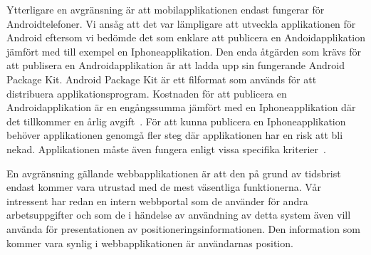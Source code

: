 \documentclass[a4paper,12pt]{article}
\begin{document}
%

Ytterligare en avgränsning är att mobilapplikationen endast fungerar för Androidtelefoner.
Vi ansåg att det var lämpligare att utveckla applikationen för Android eftersom vi bedömde det som enklare att publicera en Andoidapplikation jämfört med till exempel en Iphoneapplikation. Den enda åtgärden som krävs för att publisera en Androidapplikation är att ladda upp sin fungerande Android Package Kit. Android Package Kit är ett filformat som används för att distribuera applikationsprogram. Kostnaden för att publicera en Androidapplikation är en engångssumma jämfört med en Iphoneapplikation där det tillkommer en årlig avgift~\cite{android,guidePublish}. För att kunna publicera en Iphoneapplikation behöver applikationen genomgå fler steg där applikationen har en risk att bli nekad. Applikationen måste även fungera enligt vissa specifika kriterier~\cite{submitIphone,guidePublish}.

 En avgränsning gällande webbapplikationen är att den på grund av tidsbrist endast kommer vara utrustad med de mest väsentliga funktionerna. Vår intressent har redan en intern webbportal som de använder för andra arbetsuppgifter och som de i händelse av användning av detta system även vill använda för presentationen av positioneringsinformationen. Den information som kommer vara synlig i webbapplikationen är användarnas position.

\end{document}
